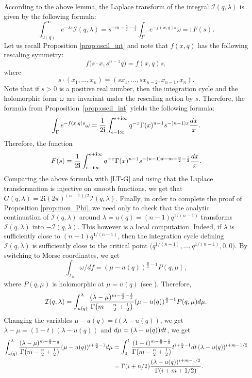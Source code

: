 \documentclass[10pt,a4paper]{article}
\numberwithin{equation}{section}
\newcommand{\ii}{\mathbf{i}}
\newcommand{\I}{\mathcal{I}}
\begin{document}
According to the above lemma, the Laplace transform of the integral
$\mathcal{I}(q,\lambda)$ is given by the following formula:
\[
\int_{u(q)}^\infty e^{-\lambda s} \mathcal{I}(q,\lambda)=
s^{-m+\frac{n}{2} -\frac{1}{2}}
\int_\Gamma e^{-f(x,q) s} \omega=:F(s).
\]
Let us recall Proposition \ref{prop:oscil_int} and note that $f(x,q)$
has the following rescaling symmetry:
\[
f\big(s\cdot x, s^{n-1} q\big)= f(x,q)s,
\]
 where
\[
s\cdot (x_1,\dots, x_n) = (s x_1,\dots, s x_{n-2}, x_{n-1}, x_n).
\]
Note that if $s>0$ is a positive real number, then the integration
cycle and the holomorphic form~$\omega$ are invariant under the
rescaling action by $s$. Therefore, the formula from Proposition~\ref{prop:oscil_int} yields the following formula:
\[
\int_{\Gamma} e^{-f(x,q) s} \omega = \frac{1}{2\ii}
\int_{\epsilon-\ii\infty}^{\epsilon+\ii\infty}
q^{-x} \Gamma(x)^{n-1} s^{-(n-1) x} \frac{{\rm d}x}{x}.
\]
Therefore, the function
\[
F(s) = \frac{1}{2\ii}
\int_{\epsilon-\ii\infty}^{\epsilon+\ii\infty}
q^{-x} \Gamma(x)^{n-1} s^{-(n-1) x -m+\frac{n}{2} -\frac{1}{2} } \frac{{\rm d}x}{x}.
\]
Comparing the above formula with \eqref{LT-G} and using that the Laplace transformation is injective on smooth functions, we get that
$G(q,\lambda)= 2\ii (2\pi)^{(n-1)/2} \I(q,\lambda)$. Finally, in order
to complete the proof of Proposition \ref{prop:mon_Phi}, we need only
to check that the analytic continuation of $\I(q,\lambda)$ around
$\lambda=u(q)=(n-1) q^{1/(n-1)}$ transforms $\I(q,\lambda)$ into
$-\I(q,\lambda)$. This however is a local computation. Indeed, if
$\lambda$ is sufficiently close to $(n-1) q^{1/(n-1)}$, then the
integration cycle defining $\I(q,\lambda)$ is sufficiently close to
the critical point $\big(q^{1/(n-1)},\dots, q^{1/(n-1)},0,0\big)$. By
switching to Morse coordinates, we get
\[
\int_{\Gamma_\mu} \omega/df = (\mu-u(q))^{\frac{n}{2}-1} P(q,\mu),
\]
where $P(q,\mu)$ is holomorphic at $\mu=u(q)$
(see \cite[Section 12.1, Lemma 2]{AGuV}). Therefore,
\begin{equation}\label{vanishing_period}
\mathcal{I}(q,\lambda) = \int_{u(q)}^\lambda
\frac{(\lambda-\mu)^{m-\frac{n}{2}-\frac{1}{2}} }{
 \Gamma\big(m-\frac{n}{2}+\frac{1}{2}\big) }
(\mu-u(q))^{\frac{n}{2}-1} P(q,\mu){\rm d}\mu.
\end{equation}
Changing the variables $\mu-u(q) = t (\lambda-u(q))$, we get
$\lambda-\mu= (1-t)(\lambda-u(q))$ and ${\rm d}\mu = (\lambda-u(q)) {\rm d}t$, we
get
\begin{align*}
\int_{u(q)}^\lambda
\frac{(\lambda-\mu)^{m-\frac{n}{2}-\frac{1}{2}} }{
 \Gamma\big(m-\frac{n}{2}+\frac{1}{2}\big) }
(\mu-u(q))^{i+\frac{n}{2}-1} {\rm d}\mu & = \int_0^1
\frac{(1-t)^{m-\frac{n}{2}-\frac{1}{2}} }{
 \Gamma\big(m-\frac{n}{2}+\frac{1}{2}\big) } t^{i+\frac{n}{2}-1} {\rm d}t \,
 (\lambda-u(q))^{i+m-1/2}
 \\
 &
 = \Gamma(i+n/2)
\frac{(\lambda-u(q))^{i+m-1/2} }{ \Gamma(i+m+1/2)}.
\end{align*}
\end{document}

